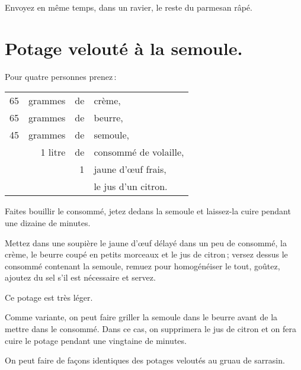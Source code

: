 Envoyez en même temps, dans un ravier, le reste du parmesan râpé.

\section*{\centering Potage velouté à la semoule.}

Pour quatre personnes prenez :

\medskip

\footnotesize
\begin{longtable}{rrrp{16em}}                                                    
     65 & grammes     & de & crème,                                                                       \\
     65 & grammes     & de & beurre,                                                                      \\
     45 & grammes     & de & semoule,                                                                     \\
        & 1 litre     & de & consommé de volaille,                                                        \\
        &             &  1 & jaune d'œuf frais,                                                           \\
        &             &    & le jus d’un citron.                                                          \\
\end{longtable}
\normalsize

Faites bouillir le consommé, jetez dedans la semoule et laissez-la cuire
pendant une dizaine de minutes. 

Mettez dans une soupière le jaune d'œuf délayé dans un peu de consommé, la
crème, le beurre coupé en petits morceaux et le jus de citron ; versez dessus
le consommé contenant la semoule, remuez pour homogénéiser le tout, goûtez,
ajoutez du sel s'il est nécessaire et servez.

Ce potage est très léger.

\sk

Comme variante, on peut faire griller la semoule dans le beurre avant de la
mettre dans le consommé. Dans ce cas, on supprimera le jus de citron et on fera
cuire le potage pendant une vingtaine de minutes.

\sk

On peut faire de façons identiques des potages veloutés au gruau de sarrasin.

